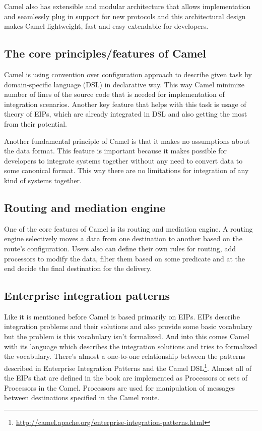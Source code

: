 \documentclass[12pt,final,oneside]{fithesis2}
\begin{document}
Camel also has extensible and modular architecture that allows implementation and seamlessly plug in support for new protocols and this architectural design makes Camel lightweight, fast and easy extendable for developers.\cite{camel-in-action}

\subsection{The core principles/features of Camel}
Camel is using convention over configuration approach to describe given task by domain-specific language (DSL) in declarative way. This way Camel minimize number of lines of the source code that is needed for implementation of integration scenarios. Another key feature that helps with this task is usage of theory of EIPs, which are already integrated in DSL and also getting the most from their potential. 

Another fundamental principle of Camel is that it makes no assumptions about the data format. This feature is important because it makes possible for developers to integrate  systems together without any need to convert data to some canonical format. This way there are no limitations for integration of any kind of systems together\cite{camel-in-action}.

\subsection*{Routing and mediation engine}
One of the core features of Camel is its routing and mediation engine. A routing engine selectively moves a data from one destination to another based on the route’s configuration. Users also can define their own rules for routing, add processors to modify the data, filter them based on some predicate and at the end decide the final destination for the delivery.

\subsection*{Enterprise integration patterns}
Like it is mentioned before Camel is based primarily on EIPs. EIPs describe integration problems and their solutions and also provide some basic vocabulary but the problem is this vocabulary isn't formalized. And into this comes Camel with its language which describes the integration solutions and tries to formalized the vocabulary. There's almost a one-to-one relationship between the patterns described in
Enterprise Integration Patterns and the Camel DSL\footnote{\url{http://camel.apache.org/enterprise-integration-patterns.html}}.
Almost all of the EIPs that are defined in the book are implemented as Processors or sets of Processors in the Camel. Processors are used for manipulation of messages between destinations specified in the Camel route.\cite{camel-dzone}
\end{document}
